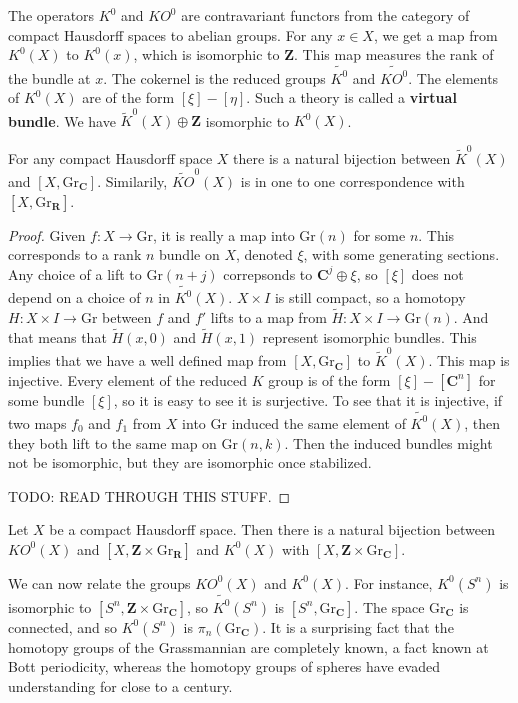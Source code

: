 The operators $K^0$ and $KO^0$ are contravariant functors from the category of compact Hausdorff spaces to abelian groups. For any $x \in X$, we get a map from $K^0(X)$ to $K^0(x)$, which is isomorphic to $\mathbf{Z}$. This map measures the rank of the bundle at $x$. The cokernel is the reduced groups $\widetilde{K^0}$ and $\widetilde{KO^0}$. The elements of $K^0(X)$ are of the form $[\xi] - [\eta]$. Such a theory is called a {\bf virtual bundle}. We have $\widetilde{K}^0(X) \oplus \mathbf{Z}$ isomorphic to $K^0(X)$.

\begin{theorem}
    For any compact Hausdorff space $X$ there is a natural bijection between $\widetilde{K}^0(X)$ and $[X,\text{Gr}_{\mathbf{C}}]$. Similarily, $\widetilde{KO}^0(X)$ is in one to one correspondence with $[X,\text{Gr}_{\mathbf{R}}]$.
\end{theorem}
\begin{proof}
    Given $f: X \to \text{Gr}$, it is really a map into $\text{Gr}(n)$ for some $n$. This corresponds to a rank $n$ bundle on $X$, denoted $\xi$, with some generating sections. Any choice of a lift to $\text{Gr}(n + j)$ correpsonds to $\mathbf{C}^j \oplus \xi$, so $[\xi]$ does not depend on a choice of $n$ in $\widetilde{K^0}(X)$. $X \times I$ is still compact, so a homotopy $H: X \times I \to \text{Gr}$ between $f$ and $f'$ lifts to a map from $\tilde{H}: X \times I \to \text{Gr}(n)$. And that means that $\tilde{H}(x,0)$ and $\tilde{H}(x,1)$ represent isomorphic bundles. This implies that we have a well defined map from $[X,\text{Gr}_{\mathbf{C}}]$ to $\widetilde{K}^0(X)$. This map is injective. Every element of the reduced $K$ group is of the form $[\xi] - [\mathbf{C}^n]$ for some bundle $[\xi]$, so it is easy to see it is surjective. To see that it is injective, if two maps $f_0$ and $f_1$ from $X$ into $\text{Gr}$ induced the same element of $\widetilde{K^0}(X)$, then they both lift to the same map on $\text{Gr}(n,k)$. Then the induced bundles might not be isomorphic, but they are isomorphic once stabilized.

    TODO: READ THROUGH THIS STUFF.
\end{proof}

\begin{corollary}
    Let $X$ be a compact Hausdorff space. Then there is a natural bijection between $KO^0(X)$ and $[X,\mathbf{Z} \times \text{Gr}_{\mathbf{R}}]$ and $K^0(X)$ with $[X,\mathbf{Z} \times \text{Gr}_{\mathbf{C}}]$.
\end{corollary}

We can now relate the groups $KO^0(X)$ and $K^0(X)$. For instance, $K^0(S^n)$ is isomorphic to $[S^n, \mathbf{Z} \times \text{Gr}_{\mathbf{C}}]$, so $\widetilde{K^0}(S^n)$ is $[S^n, \text{Gr}_{\mathbf{C}}]$. The space $\text{Gr}_{\mathbf{C}}$ is connected, and so $K^0(S^n)$ is $\pi_n(\text{Gr}_{\mathbf{C}})$. It is a surprising fact that the homotopy groups of the Grassmannian are completely known, a fact known at Bott periodicity, whereas the homotopy groups of spheres have evaded understanding for close to a century.